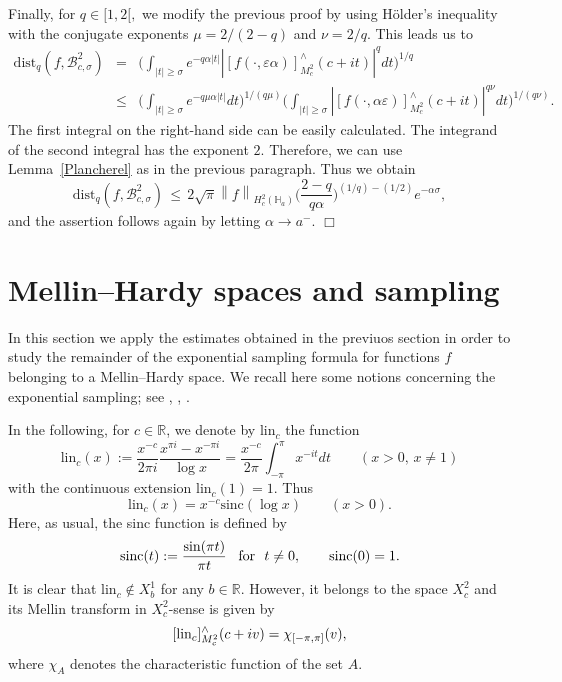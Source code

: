 \documentclass[amsmath,english,a4paper,graphicx,12pt]{article}
\newcommand{\eps}{\mbox{$\varepsilon$}}
\newcommand{\R}{\mathbb{R}}
\newcommand{\li}{\left}
\newcommand{\ri}{\right}
\newcommand{\abs}[1]{\left|#1\right|}
\begin{document}
Finally, for $q \in [1,2{[},$ %
we modify the previous proof by using  H\"older's inequality with the conjugate exponents $\mu = 2/(2-q)$ and $\nu = 2/q$.
This leads us to 
\begin{eqnarray*}
\mbox{dist}_q(f, \mathscr{B}^2_{c, \sigma})&=&\bigg(\int_{|t| \geq \sigma}e^{-q\alpha\abs{t}}\abs{[f(\cdot, \eps\alpha)]^\wedge_{M^2_c}(c+it)}^qdt\bigg)^{1/q}\\
  &\le& \bigg(\int_{|t| \geq \sigma} e^{-q\mu \alpha |t|}dt\bigg)^{1/(q\mu)}
 \bigg(\int_{|t| \geq \sigma}\abs{[f(\cdot, \alpha \varepsilon)]^\wedge_{M^2_c}(c+it)}^{q\nu} dt\bigg)^{1/(q\nu)}.
\end{eqnarray*}
The first integral on the right-hand side can be easily calculated. The integrand of the second integral has the exponent $2$. Therefore, we can use
Lemma~\ref{Plancherel} as in the previous paragraph. Thus we obtain
$$\mbox{dist}_q(f, \mathscr{B}^2_{c, \sigma})\,\le\,2\sqrt{\pi}\li\|f\ri\|_{H^2_c(\mathbb{H}_a)}\bigg(\frac{2-q}{q\alpha}\bigg)^{(1/q) - (1/2)}e^{-\alpha \sigma},$$
and the assertion follows again by letting $\alpha \rightarrow a^-.$ \hfill $\Box$


\section{Mellin--Hardy spaces and sampling}
In this section we apply the estimates obtained in the previuos section in order to study the remainder of the exponential sampling formula for 
functions $f$ belonging to a Mellin--Hardy space. We recall here some notions concerning the exponential sampling; see \cite{BJ3}, \cite{BBM1}, \cite{SCH}.

In the following, for $c \in \mathbb{R}$, we denote by $\mbox{lin}_c$  the function
$$\mbox{lin}_c(x) := \frac{x^{-c}}{2\pi i}\frac{x^{\pi i} -x^{-\pi i}}{\log x} = \frac{x^{-c}}{2\pi}\int_{-\pi}^\pi x^{-it}dt \qquad (x>0, \, x\neq 1)$$
with the continuous extension $\mbox{lin}_c(1) = 1.$ Thus 
$$\mbox{lin}_c(x) = x^{-c}\mbox{sinc}(\log x) \qquad (x>0).$$
Here, as usual, the sinc function is defined by 
$$\mbox{sinc}(t):= \frac{\sin (\pi t)}{\pi t}~ \mbox{ \,for }~t\neq 0,\qquad \mbox{sinc}(0) = 1.$$
It is clear that $\mbox{lin}_c \not \in X^1_b$ for any $b\in \R.$ However, it belongs to the space $X^2_c$ and its Mellin transform in 
$X^2_c$-sense is given by
$$[\mbox{\rm lin}_c]^\wedge_{M_c^2}(c+iv) = \chi_{[-\pi, \pi]}(v),$$
where $\chi_A$ denotes the characteristic function of the set $A.$
\end{document}
